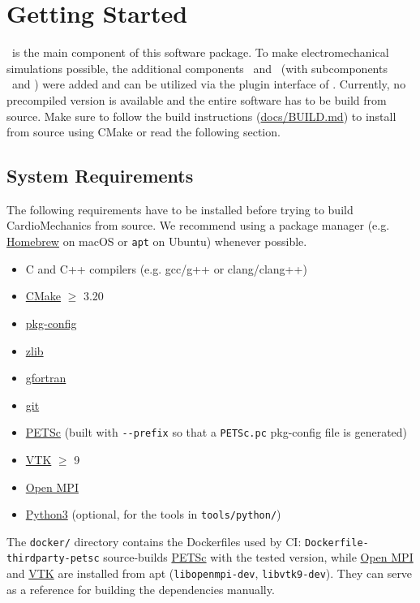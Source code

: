 \section{Getting Started}
\label{sec:gettingstrated}

\CM~is the main component of this software package.
To make electromechanical simulations possible, the additional components \ACC~and \CMT~(with subcomponents \EMT~and \FMT) were added and can be utilized via the plugin interface of \CM.
Currently, no precompiled version is available and the entire software has to be build from source.
Make sure to follow the build instructions  (\href{https://github.com/KIT-IBT/CardioMechanics/blob/main/docs/BUILD.md}{docs/BUILD.md}) to install from source using CMake or read the following section.

\subsection{System Requirements}

The following requirements have to be installed before trying to build CardioMechanics from source.
We recommend using a package manager (e.g. \href{https://brew.sh}{Homebrew} on macOS or \verb|apt| on Ubuntu) whenever possible.
\begin{itemize}
    \item C and C++ compilers (e.g. gcc/g++ or clang/clang++)
    \item \href{https://cmake.org}{CMake} $\geq$ 3.20
    \item \href{https://www.freedesktop.org/wiki/Software/pkg-config/}{pkg-config}
    \item \href{https://zlib.net}{zlib}
    \item \href{https://gcc.gnu.org/fortran/}{gfortran}
    \item \href{https://git-scm.com}{git}
    \item \href{https://petsc.org/}{PETSc} (built with \verb|--prefix| so that a \verb|PETSc.pc| pkg-config file is generated)
    \item \href{https://vtk.org}{VTK} $\geq$ 9
    \item \href{https://www.open-mpi.org}{Open MPI}
    \item \href{https://www.python.org}{Python3} (optional, for the tools in \verb|tools/python/|)
\end{itemize}
The \verb|docker/| directory contains the Dockerfiles used by CI: \verb|Dockerfile-thirdparty-petsc| source-builds \href{https://petsc.org/}{PETSc} with the tested version, while \href{https://www.open-mpi.org}{Open MPI} and \href{https://vtk.org}{VTK} are installed from apt (\verb|libopenmpi-dev|, \verb|libvtk9-dev|). They can serve as a reference for building the dependencies manually.

